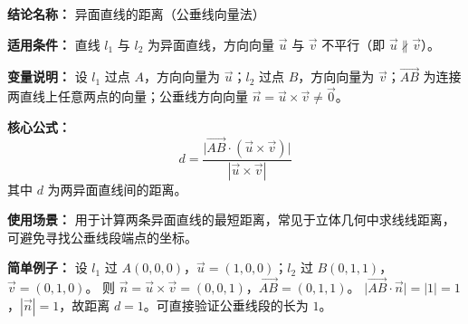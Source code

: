 \textbf{结论名称：} 异面直线的距离（公垂线向量法）

\textbf{适用条件：} 直线 \(l_1\) 与 \(l_2\) 为异面直线，方向向量 \(\vec{u}\) 与 \(\vec{v}\) 不平行（即 \(\vec{u}\nparallel\vec{v}\)）。

\textbf{变量说明：} 设 \(l_1\) 过点 \(A\)，方向向量为 \(\vec{u}\)；\(l_2\) 过点 \(B\)，方向向量为 \(\vec{v}\)；\(\overrightarrow{AB}\) 为连接两直线上任意两点的向量；公垂线方向向量 \(\vec{n}=\vec{u}\times\vec{v}\neq\vec{0}\)。

\textbf{核心公式：} 
\[
\boxed{d = \frac{\bigl| \overrightarrow{AB} \cdot (\vec{u} \times \vec{v}) \bigr|}{|\vec{u} \times \vec{v}|}}
\]
其中 \(d\) 为两异面直线间的距离。

\textbf{使用场景：} 用于计算两条异面直线的最短距离，常见于立体几何中求线线距离，可避免寻找公垂线段端点的坐标。

\textbf{简单例子：} 
设 \(l_1\) 过 \(A(0,0,0)\)，\(\vec{u}=(1,0,0)\)；\(l_2\) 过 \(B(0,1,1)\)，\(\vec{v}=(0,1,0)\)。  
则 \(\vec{n}=\vec{u}\times\vec{v}=(0,0,1)\)，\(\overrightarrow{AB}=(0,1,1)\)。  
\(\bigl|\overrightarrow{AB}\cdot\vec{n}\bigr| = |1| = 1\)，\(|\vec{n}| = 1\)，故距离 \(d = 1\)。可直接验证公垂线段的长为 \(1\)。